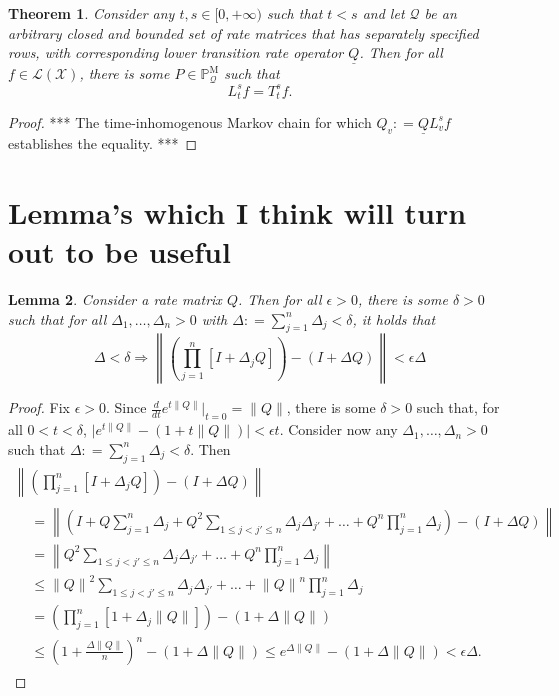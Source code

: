\documentclass[a4paper,reqno]{amsart}
\newtheorem{theorem}{Theorem}
\newtheorem{lemma}[theorem]{Lemma}
\newcommand{\states}{\mathcal{X}}
\newcommand{\processes}{\mathbb{P}}
\newcommand{\mprocesses}{\processes^{\mathrm{M}}}
\newcommand{\lbound}{L}
\newcommand{\gambles}{\mathcal{L}}
\newcommand{\gamblesX}{\gambles(\states)}
\newcommand{\rateset}{\mathcal{Q}}
\newcommand{\lrate}{\underline{Q}}
\newcommand{\then}{\Rightarrow}
\newcommand{\coloneqq}{:\!=}
\begin{document}
\begin{theorem}
Consider any $t,s\in[0,+\infty)$ such that $t<s$ and let $\rateset$ be an arbitrary closed and bounded set of rate matrices that has separately specified rows, with corresponding lower transition rate operator $\lrate$. Then for all $f\in\gamblesX$, there is some $P\in\mprocesses_{\rateset}$ such that
\begin{equation*}
\lbound_t^sf=T_t^sf.
\end{equation*}
\end{theorem}
\begin{proof}
*** The time-inhomogenous Markov chain for which $Q_v\coloneqq\lrate\lbound_v^sf$ establishes the equality. ***
\end{proof}

\section{Lemma's which I think will turn out to be useful}

\begin{lemma}\label{lemma:smallerpartition}
Consider a rate matrix $Q$. Then for all $\epsilon>0$, there is some $\delta>0$ such that for all $\Delta_1,\dots,\Delta_n>0$ with $\Delta\coloneqq\sum_{j=1}^n\Delta_j<\delta$, it holds that
\begin{equation*}
\Delta<\delta\then\left\lVert\left(\prod_{j=1}^n[I+\Delta_j Q]\right)-(I+\Delta Q)\right\rVert<\epsilon\Delta
\end{equation*}


\end{lemma}
\begin{proof}
Fix $\epsilon>0$. Since $\frac{d}{dt}e^{t\lVert Q\rVert}\vert_{t=0}=\lVert Q\rVert$, there is some $\delta>0$ such that, for all $0<t<\delta$, $\big\vert e^{t\lVert Q\rVert}- (1+t\lVert Q\rVert)\big\vert<\epsilon t$. Consider now any $\Delta_1,\dots,\Delta_n>0$ such that $\Delta\coloneqq\sum_{j=1}^n\Delta_j<\delta$. Then
\begin{multline*}
\left\lVert\left(\prod_{j=1}^n[I+\Delta_j Q]\right)-(I+\Delta Q)\right\rVert\\
\begin{aligned}
&=
\left\lVert\left(I+Q\sum_{j=1}^n\Delta_j+Q^2\sum_{1\leq j<j'\leq n}\Delta_j\Delta_{j'}+ \dots +Q^n\prod_{j=1}^n\Delta_j\right)-(I+\Delta Q)\right\rVert\\
&=
\left\lVert Q^2\sum_{1\leq j<j'\leq n}\Delta_j\Delta_{j'}+ \dots +Q^n\prod_{j=1}^n\Delta_j \right\rVert\\
&\leq
{\lVert Q\rVert}^2\sum_{1\leq j<j'\leq n}\Delta_j\Delta_{j'}+ \dots +{\lVert Q\rVert}^n\prod_{j=1}^n\Delta_j\\
&=\left(\prod_{j=1}^n[1+\Delta_j\lVert Q\rVert]\right)-(1+\Delta\lVert Q\rVert)\\
&\leq \left(1+\frac{\Delta\lVert Q\rVert}{n}\right)^n-(1+\Delta\lVert Q\rVert)
\leq e^{\Delta\lVert Q\rVert}-(1+\Delta\lVert Q\rVert)
<\epsilon\Delta.
\end{aligned}
\end{multline*}
\end{proof}
\end{document}
